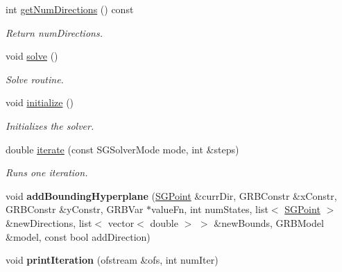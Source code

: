 \begin{DoxyCompactItemize}
int \hyperlink{classSGSolver__MaxMinMax__GRB_a2d430095d9f4eed1f776fcff2f28b2f6}{get\+Num\+Directions} () const
\begin{DoxyCompactList}\small\item\em Return num\+Directions. \end{DoxyCompactList}\item 
\mbox{\label{classSGSolver__MaxMinMax__GRB_a18ce49bafd6d592c5b889d2e37d34215}} 
void \hyperlink{classSGSolver__MaxMinMax__GRB_a18ce49bafd6d592c5b889d2e37d34215}{solve} ()
\begin{DoxyCompactList}\small\item\em Solve routine. \end{DoxyCompactList}\item 
\mbox{\label{classSGSolver__MaxMinMax__GRB_a53c7768ce8fae4ae40fa8c02946349f3}} 
void \hyperlink{classSGSolver__MaxMinMax__GRB_a53c7768ce8fae4ae40fa8c02946349f3}{initialize} ()
\begin{DoxyCompactList}\small\item\em Initializes the solver. \end{DoxyCompactList}\item 
\mbox{\label{classSGSolver__MaxMinMax__GRB_a11e74dc20f359766064a68e6f710a457}} 
double \hyperlink{classSGSolver__MaxMinMax__GRB_a11e74dc20f359766064a68e6f710a457}{iterate} (const S\+G\+Solver\+Mode mode, int \&steps)
\begin{DoxyCompactList}\small\item\em Runs one iteration. \end{DoxyCompactList}\item 
\mbox{\label{classSGSolver__MaxMinMax__GRB_a572564a0d6933cbab39c488e2bdf6754}} 
void {\bfseries add\+Bounding\+Hyperplane} (\hyperlink{classSGPoint}{S\+G\+Point} \&curr\+Dir, G\+R\+B\+Constr \&x\+Constr, G\+R\+B\+Constr \&y\+Constr, G\+R\+B\+Var $\ast$value\+Fn, int num\+States, list$<$ \hyperlink{classSGPoint}{S\+G\+Point} $>$ \&new\+Directions, list$<$ vector$<$ double $>$ $>$ \&new\+Bounds, G\+R\+B\+Model \&model, const bool add\+Direction)
\item 
\mbox{\label{classSGSolver__MaxMinMax__GRB_a69ad4bb88098ca13192063f3a513f6c0}} 
void {\bfseries print\+Iteration} (ofstream \&ofs, int num\+Iter)
\end{DoxyCompactItemize}
